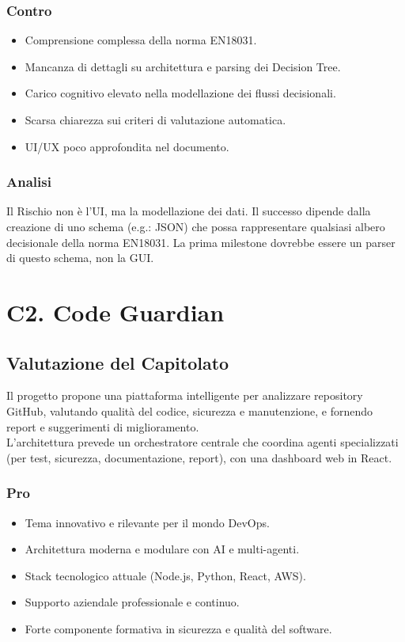 \documentclass[a4paper, 11pt, oneside]{scrartcl} %
\begin{document}
\subsubsection*{Contro}
\begin{itemize}
    \item Comprensione complessa della norma EN18031.
    \item Mancanza di dettagli su architettura e parsing dei Decision Tree.
    \item Carico cognitivo elevato nella modellazione dei flussi decisionali.
    \item Scarsa chiarezza sui criteri di valutazione automatica.
    \item UI/UX poco approfondita nel documento.
\end{itemize}
\subsubsection*{Analisi}
Il Rischio non è l'UI, ma la modellazione dei dati. Il successo dipende dalla creazione di uno schema (e.g.: JSON) che possa rappresentare qualsiasi albero decisionale della norma EN18031. La prima milestone dovrebbe essere un parser di questo schema, non la GUI.

\section{C2. Code Guardian}
\subsection*{Valutazione del Capitolato}
Il progetto propone una piattaforma intelligente per analizzare repository GitHub, valutando qualità del codice, sicurezza e manutenzione, e fornendo report e suggerimenti di miglioramento.\\
L’architettura prevede un orchestratore centrale che coordina agenti specializzati (per test, sicurezza, documentazione, report), con una dashboard web in React.

\subsubsection*{Pro}
\begin{itemize}
    \item Tema innovativo e rilevante per il mondo DevOps.
    \item Architettura moderna e modulare con AI e multi-agenti.
    \item Stack tecnologico attuale (Node.js, Python, React, AWS).
    \item Supporto aziendale professionale e continuo.
    \item Forte componente formativa in sicurezza e qualità del software.
\end{itemize}
\end{document}
